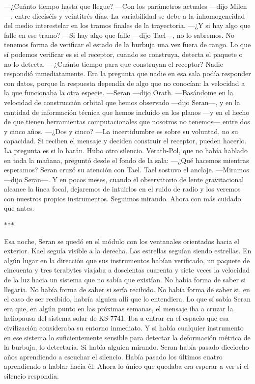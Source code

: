 \documentclass[11pt,a5paper,twoside]{book}
\begin{document}
—¿Cuánto tiempo hasta que llegue?
—Con los parámetros actuales —dijo Milen—, entre dieciséis y veintitrés días. La variabilidad se debe a la inhomogeneidad del medio interestelar en los tramos finales de la trayectoria.
—¿Y si hay algo que falle en ese tramo?
—Si hay algo que falle —dijo Tael—, no lo sabremos. No tenemos forma de verificar el estado de la burbuja una vez fuera de rango. Lo que sí podemos verificar es si el receptor, cuando se construya, detecta el paquete o no lo detecta.
—¿Cuánto tiempo para que construyan el receptor?
Nadie respondió inmediatamente. Era la pregunta que nadie en esa sala podía responder con datos, porque la respuesta dependía de algo que no conocían: la velocidad a la que funcionaba la otra especie.
—Seran —dijo Orath.
—Basándome en la velocidad de construcción orbital que hemos observado —dijo Seran—, y en la cantidad de información técnica que hemos incluido en los planos —y en el hecho de que tienen herramientas computacionales que nosotros no tenemos— entre dos y cinco años.
—¿Dos y cinco?
—La incertidumbre es sobre su voluntad, no su capacidad. Si reciben el mensaje y deciden construir el receptor, pueden hacerlo. La pregunta es si lo harán.
Hubo otro silencio.
Verath-Pol, que no había hablado en toda la mañana, preguntó desde el fondo de la sala:
—¿Qué hacemos mientras esperamos?
Seran cruzó su atención con Tael. Tael sostuvo el anclaje.
—Miramos —dijo Seran—. Y en pocos meses, cuando el observatorio de lente gravitacional alcance la línea focal, dejaremos de intuirlos en el ruido de radio y los veremos con nuestros propios instrumentos. Seguimos mirando. Ahora con más cuidado que antes.

\vspace{1.5em}
\begin{center}$\ast$\quad$\ast$\quad$\ast$\end{center}
\vspace{1.5em}

Esa noche, Seran se quedó en el módulo con los ventanales orientados hacia el exterior.
Kael seguía visible a la derecha. Las estrellas seguían siendo estrellas. En algún lugar en la dirección que sus instrumentos habían verificado, un paquete de cincuenta y tres terabytes viajaba a doscientas cuarenta y siete veces la velocidad de la luz hacia un sistema que no sabía que existían.
No había forma de saber si llegaría. No había forma de saber si sería recibido. No había forma de saber si, en el caso de ser recibido, habría alguien allí que lo entendiera.
Lo que sí sabía Seran era que, en algún punto en las próximas semanas, el mensaje iba a cruzar la heliopausa del sistema solar de KS-7741. Iba a entrar en el espacio que esa civilización consideraba su entorno inmediato. Y si había cualquier instrumento en ese sistema lo suficientemente sensible para detectar la deformación métrica de la burbuja, lo detectaría.
Si había alguien mirando.
Seran había pasado dieciocho años aprendiendo a escuchar el silencio. Había pasado los últimos cuatro aprendiendo a hablar hacia él.
Ahora lo único que quedaba era esperar a ver si el silencio respondía.
\end{document}
